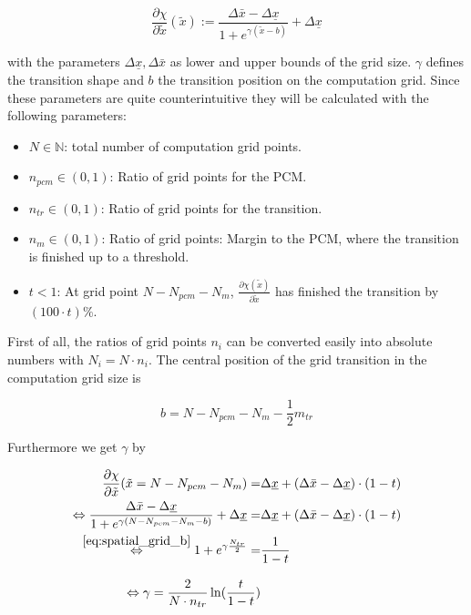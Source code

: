 \documentclass{scrartcl}[12pt, halfparskip]
\numberwithin{equation}{section}
\numberwithin{figure}{section}
\numberwithin{table}{section}
\begin{document}
\begin{equation}
	\frac{\partial \chi}{\partial \tilde{x}}(\tilde{x}) := \frac{\Delta \bar{x} - \Delta \underline{x}}{1 + e^{\gamma(\tilde{x} - b)}} + \Delta \underline{x}
\end{equation}

with the parameters $\Delta \underline{x}, \Delta \bar{x}$ as lower and upper bounds of the grid size. $\gamma$ defines the transition shape and $b$ the transition position on the computation grid. Since these parameters are quite counterintuitive they will be calculated with the following parameters:

\begin{itemize}
	\item $N \in \mathbb{N}$: total number of computation grid points.
	\item $n_{pcm} \in (0,1)$: Ratio of grid points for the PCM.
	\item $n_{tr} \in (0,1)$: Ratio of grid points for the transition.
	\item $n_{m} \in (0,1)$: Ratio of grid points: Margin to the PCM, where the transition is finished up to a threshold.
	\item $t < 1$: At grid point $N-N_{pcm}-N_m$, $\frac{\partial \chi(\tilde{x})}{\partial \tilde{x}}$ has finished the transition by $(100 \cdot t)\%$.
\end{itemize}

First of all, the ratios of grid points $n_i$ can be converted easily into absolute numbers with $N_i = N \cdot n_i$. The central position of the grid transition in the computation grid size is

\begin{equation}
	b = N - N_{pcm} - N_m - \frac{1}{2} m_{tr}
	\label{eq:spatial_grid_b}
\end{equation}

Furthermore we get $\gamma$ by

\begin{subequations}
\begin{align}
	\frac{\partial \chi}{\partial \tilde{x}}(\tilde{x}=N-N_{pcm}-N_m) = & \Delta \underline{x} + (\Delta \bar{x} - \Delta \underline{x}) \cdot (1-t) \\
	\Leftrightarrow \frac{\Delta \bar{x} - \Delta \underline{x}}{1 + e^{\gamma(N-N_{pcm}-N_m - b)}} + \Delta \underline{x} = & \Delta \underline{x} + (\Delta \bar{x} - \Delta \underline{x}) \cdot (1-t)  \\
	\stackrel{\cref{eq:spatial_grid_b}}{\Leftrightarrow}  1 + e^{\gamma \frac{N_{tr}}{2}} = & \frac{1}{1 - t}  \\[2ex]
	\Leftrightarrow \gamma = \frac{2}{N \cdot n_{tr}} \ln(\frac{t}{1-t})
\end{align}
\end{subequations}
\end{document}

